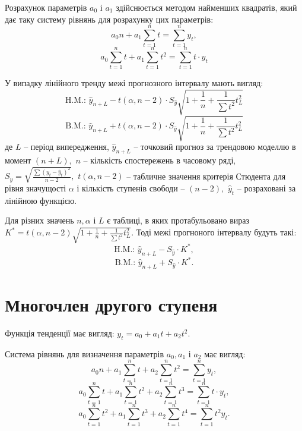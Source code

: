 \documentclass[a4paper, fontsize=10pt, oneside]{article}
\begin{document}
		Розрахунок параметрів $a_0$ і $a_1$ здійснюється методом найменших квадратів, який дає таку систему рівнянь для розрахунку цих параметрів:
		\begin{equation*}
		a_0 n + a_1 \sum_{t=1}^n t = \sum_{t=1}^n y_t,
		\end{equation*}
		\begin{equation*}
		a_0 \sum_{t=1}^n t + a_1 \sum_{t=1}^n t^2 = \sum_{t=1}^n t \cdot y_t
\end{equation*}

		У випадку лінійного тренду межі прогнозного інтервалу мають вигляд:
		\begin{equation*}
		\text{H.M.: } \hat y_{n+L} - t (\alpha, n-2) \cdot S_{\hat y} \sqrt{1 + \frac{1}{n} + \frac{1}{\sum t^2} t_L^2} 
		\end{equation*}						
		\begin{equation*}
		\text{B.M.: } \hat y_{n+L} + t (\alpha, n-2) \cdot S_{\hat y} \sqrt{1 + \frac{1}{n} + \frac{1}{\sum t^2} t_L^2}
		\end{equation*}
		де $L$ -- період випередження, $\hat y_{n+L}$ -- точковий прогноз за трендовою моделлю в момент $(n+L),$ $n$ -- кількість спостережень в часовому ряді, $S_{\hat y} = \sqrt{\frac{\sum (y_t - \hat y_t)^2}{n-2}},$ $t(\alpha, n-2)$ -- табличне значення критерія Стюдента для рівня значущості $\alpha$ і кількість ступенів свободи -- $(n-2),$ $\hat y_t$ -- розраховані за лінійною функцією.
		
		Для різних значень $n, \alpha$ і $L$ є таблиці, в яких протабульовано вираз $K^* = t(\alpha, n-2) \sqrt{1 + \frac{1}{n} + \frac{1}{\sum t^2} t_L^2}.$ Тоді межі прогноного інтервалу будуть такі:
	\begin{equation*}
		\text{H.M.: } \hat y_{n+L} - S_{\hat y} \cdot K^*,
	\end{equation*}		
	\begin{equation*}
		\text{B.M.: } \hat y_{n+L} + S_{\hat y} \cdot K^*.
	\end{equation*}
	\section{Многочлен другого ступеня}
	Функція тенденції має вигляд: $y_t = a_0 + a_1 t + a_2 t^2.$
	
	Система рівнянь для визначення параметрів $a_0, a_1$ і $a_2$ має вигляд:
	\begin{equation*}
		a_0 n + a_1 \sum_{t=1}^n t + a_2 \sum_{t=1}^n t^2 = \sum_{t=1}^n y_t,
	\end{equation*}
	\begin{equation*}
		a_0 \sum_{t=1}^n t + a_1 \sum_{t=1}^n t^2  + a_2 \sum_{t=1}^n t^3 = \sum_{t=1}^n t \cdot y_t,
	\end{equation*}	
	\begin{equation*}
		a_0 \sum_{t=1}^n t^2 + a_1 \sum_{t=1}^n t^3 + a_2 \sum_{t=1}^n t^4 = \sum_{t=1}^n t^2 y_t.
	\end{equation*}
	
\end{document}
